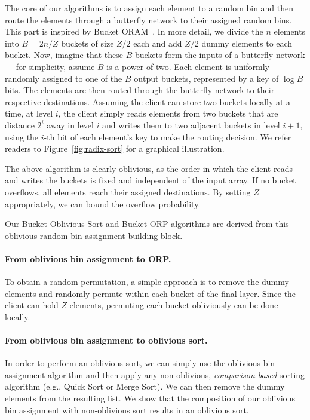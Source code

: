 The core of our algorithms is to assign each element to a random bin and then route the elements through a butterfly network to their assigned random bins. 
This part is inspired by Bucket ORAM~\cite{fletcher2015bucket}. 
In more detail, we divide the $n$ elements into $B=2n/Z$ buckets of size $Z/2$ each and add $Z/2$ dummy elements to each bucket.
Now, imagine that these $B$ buckets form the inputs of a butterfly network --- for simplicity, assume $B$ is a power of two.
Each element is uniformly randomly assigned to one of the $B$ output buckets, represented by a key of $\log B$ bits.
The elements are then routed through the butterfly network to their respective destinations.
Assuming the client can store two buckets locally at a time, at level $i$, the client simply reads elements from two buckets that are distance $2^i$ away in level $i$ and writes them to two adjacent buckets in level $i+1$, using the $i$-th bit of each element's key to make the routing decision. 
We refer readers to Figure~\ref{fig:radix-sort} for a graphical illustration.

The above algorithm is clearly oblivious, as the order in which the client reads and writes the buckets is fixed and independent of the input array. If no bucket overflows, all elements reach their assigned destinations. By setting $Z$ appropriately, we can bound the overflow probability.

Our Bucket Oblivious Sort and Bucket ORP algorithms are derived from
this oblivious random bin assignment building block. 

\paragraph{From oblivious bin assignment to ORP.}
To obtain a random permutation, 
a simple approach is to remove the dummy elements and randomly permute 
within each bucket of the final layer.
Since the client can hold $Z$ elements, permuting each bucket
obliviously can be done locally. 

\paragraph{From oblivious bin assignment to oblivious sort.}
In order to perform an oblivious sort, we can simply use the oblivious bin assignment algorithm and then  
apply any non-oblivious,
{\it comparison-based} sorting algorithm (e.g., Quick Sort or
Merge Sort). We can then remove the dummy elements from the
resulting list. We show that the composition of our oblivious bin assignment with non-oblivious sort results in an oblivious sort. 

